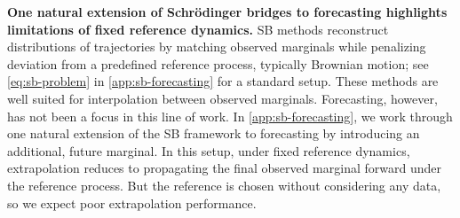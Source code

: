 \textbf{One natural extension of Schrödinger bridges to forecasting highlights limitations of fixed reference dynamics.} 
SB methods reconstruct distributions of trajectories by matching observed marginals while penalizing deviation from a predefined reference process, typically Brownian motion; see \cref{eq:sb-problem} in \cref{app:sb-forecasting} for a standard setup. These methods are well suited for interpolation between observed marginals. Forecasting, however, has not been a  focus in this line of work. In \cref{app:sb-forecasting}, we work through one natural extension of the SB framework to forecasting by introducing an additional, future marginal. In this setup, under fixed reference dynamics, extrapolation reduces to propagating the final observed marginal forward under the reference process. But the reference is chosen without considering any data, so we expect poor extrapolation performance.
